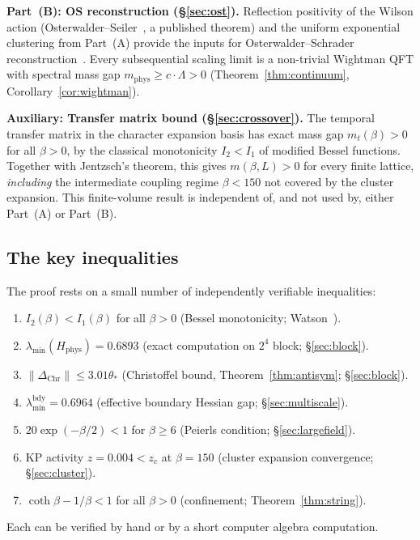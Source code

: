 \documentclass[11pt]{article}
\theoremstyle{definition}
\begin{document}
\medskip\noindent\textbf{Part~(B): OS reconstruction
(\S\ref{sec:ost}).}
Reflection positivity of the Wilson action
(Osterwalder--Seiler~\cite{OS78}, a published theorem) and the
uniform exponential clustering from Part~(A) provide the
inputs for Osterwalder--Schrader reconstruction~\cite{OS73}.
Every subsequential scaling limit is a non-trivial
Wightman QFT with spectral mass gap
$m_{\mathrm{phys}}\ge c\cdot\Lambda>0$
(Theorem~\ref{thm:continuum}, Corollary~\ref{cor:wightman}).

\medskip\noindent\textbf{Auxiliary: Transfer matrix bound
(\S\ref{sec:crossover}).}
The temporal transfer matrix in the character expansion basis has
exact mass gap $m_t(\beta)>0$ for all
$\beta>0$, by the classical monotonicity $I_2<I_1$ of modified
Bessel functions.  Together with Jentzsch's theorem, this gives
$m(\beta,L)>0$ for every finite lattice,
\emph{including} the intermediate coupling
regime $\beta<150$ not covered by the cluster expansion.
This finite-volume result is independent of, and not
used by, either Part~(A) or Part~(B).

\subsection{The key inequalities}

The proof rests on a small number of independently verifiable
inequalities:

\begin{enumerate}
\item $I_2(\beta)<I_1(\beta)$ for all $\beta>0$
(Bessel monotonicity; Watson~\cite{Watson44}).
\item $\lambda_{\min}(H_{\mathrm{phys}})=0.6893$
(exact computation on $2^4$ block; \S\ref{sec:block}).
\item $\|\Delta_{\mathrm{Chr}}\|\le 3.01\theta_*$ (Christoffel bound, Theorem~\ref{thm:antisym};
\S\ref{sec:block}).
\item $\lambda_{\min}^{\mathrm{bdy}}=0.6964$ (effective boundary
Hessian gap; \S\ref{sec:multiscale}).
\item $20\exp(-\beta/2)<1$ for $\beta\ge 6$ (Peierls condition;
\S\ref{sec:largefield}).
\item KP activity $z=0.004<z_c$ at $\beta=150$ (cluster expansion
convergence; \S\ref{sec:cluster}).
\item $\coth\beta-1/\beta<1$ for all $\beta>0$
(confinement; Theorem~\ref{thm:string}).
\end{enumerate}

Each can be verified by hand or by a short computer algebra
computation.
\end{document}
